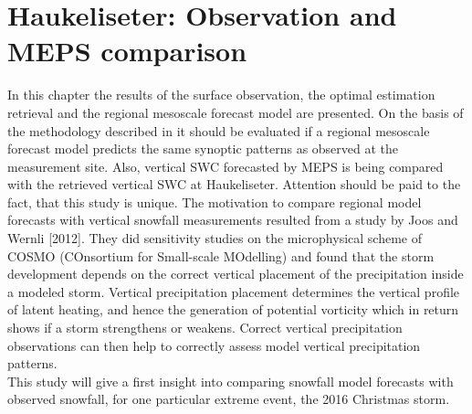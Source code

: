 \chapter{Haukeliseter: Observation and MEPS comparison}
In this chapter the results of the surface observation, the optimal estimation retrieval and the regional mesoscale forecast model are presented. On the basis of the methodology described in  it should be evaluated if a regional mesoscale forecast model predicts the same synoptic patterns as observed at the measurement site. Also, vertical SWC forecasted by MEPS is being compared with the retrieved vertical SWC at Haukeliseter. Attention should be paid to the fact, that this study is unique. The motivation to compare regional model forecasts with vertical snowfall measurements resulted from a study by Joos and Wernli [2012]. They did sensitivity studies on the microphysical scheme of COSMO (COnsortium for Small-scale MOdelling) and found that the storm development depends on the correct vertical placement of the precipitation inside a modeled storm. Vertical precipitation placement determines the vertical profile of latent heating, and hence the generation of potential vorticity which in return shows if a storm strengthens or weakens. Correct vertical precipitation observations can then help to correctly assess model vertical precipitation patterns.
\\
This study will give a first insight into comparing snowfall model forecasts with observed snowfall, for one particular extreme event, the 2016 Christmas storm.

